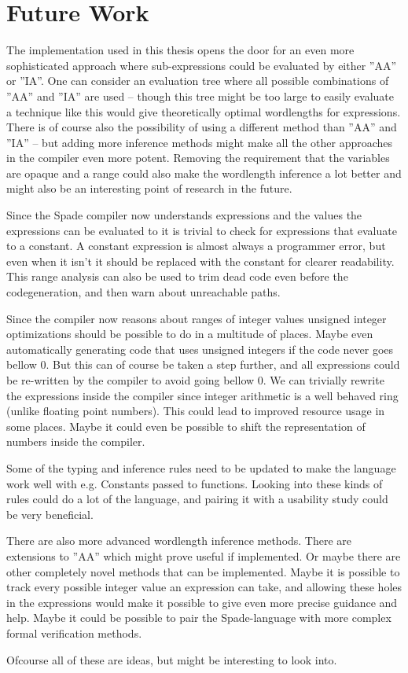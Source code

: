 \section{Future Work}
The implementation used in this thesis opens the door for an even more sophisticated approach where sub-expressions could be evaluated by either ''AA'' or ''IA''. One can consider an evaluation tree where all possible combinations of ''AA'' and ''IA'' are used -- though this tree might be too large to easily evaluate a technique like this would give theoretically optimal wordlengths for expressions. There is of course also the possibility of using a different method than ''AA'' and ''IA'' -- but adding more inference methods might make all the other approaches in the compiler even more potent. Removing the requirement that the variables are opaque and a range could also make the wordlength inference a lot better and might also be an interesting point of research in the future.

Since the Spade compiler now understands expressions and the values the expressions can be evaluated to it is trivial to check for expressions that evaluate to a constant. A constant expression is almost always a programmer error, but even when it isn't it should be replaced with the constant for clearer readability. This range analysis can also be used to trim dead code even before the codegeneration, and then warn about unreachable paths.

Since the compiler now reasons about ranges of integer values unsigned integer optimizations should be possible to do in a multitude of places. Maybe even automatically generating code that uses unsigned integers if the code never goes bellow 0. But this can of course be taken a step further, and all expressions could be re-written by the compiler to avoid going bellow 0. We can trivially rewrite the expressions inside the compiler since integer arithmetic is a well behaved ring (unlike floating point numbers). This could lead to improved resource usage in some places. Maybe it could even be possible to shift the representation of numbers inside the compiler.

Some of the typing and inference rules need to be updated to make the language work well with e.g. Constants passed to functions. Looking into these kinds of rules could do a lot of the language, and pairing it with a usability study could be very beneficial.

There are also more advanced wordlength inference methods. There are extensions to ''AA'' which might prove useful if implemented. Or maybe there are other completely novel methods that can be implemented. Maybe it is possible to track every possible integer value an expression can take, and allowing these holes in the expressions would make it possible to give even more precise guidance and help. Maybe it could be possible to pair the Spade-language with more complex formal verification methods.

Ofcourse all of these are ideas, but might be interesting to look into.
